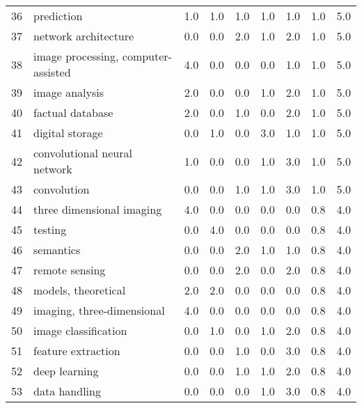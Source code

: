 \begin{tabular}{llrrrrrrr}
36 &                               prediction &   1.0 &   1.0 &   1.0 &   1.0 &   1.0 &   1.0 &    5.0 \\
37 &                     network architecture &   0.0 &   0.0 &   2.0 &   1.0 &   2.0 &   1.0 &    5.0 \\
38 &      image processing, computer-assisted &   4.0 &   0.0 &   0.0 &   0.0 &   1.0 &   1.0 &    5.0 \\
39 &                           image analysis &   2.0 &   0.0 &   0.0 &   1.0 &   2.0 &   1.0 &    5.0 \\
40 &                         factual database &   2.0 &   0.0 &   1.0 &   0.0 &   2.0 &   1.0 &    5.0 \\
41 &                          digital storage &   0.0 &   1.0 &   0.0 &   3.0 &   1.0 &   1.0 &    5.0 \\
42 &             convolutional neural network &   1.0 &   0.0 &   0.0 &   1.0 &   3.0 &   1.0 &    5.0 \\
43 &                              convolution &   0.0 &   0.0 &   1.0 &   1.0 &   3.0 &   1.0 &    5.0 \\
44 &                three dimensional imaging &   4.0 &   0.0 &   0.0 &   0.0 &   0.0 &   0.8 &    4.0 \\
45 &                                  testing &   0.0 &   4.0 &   0.0 &   0.0 &   0.0 &   0.8 &    4.0 \\
46 &                                semantics &   0.0 &   0.0 &   2.0 &   1.0 &   1.0 &   0.8 &    4.0 \\
47 &                           remote sensing &   0.0 &   0.0 &   2.0 &   0.0 &   2.0 &   0.8 &    4.0 \\
48 &                      models, theoretical &   2.0 &   2.0 &   0.0 &   0.0 &   0.0 &   0.8 &    4.0 \\
49 &               imaging, three-dimensional &   4.0 &   0.0 &   0.0 &   0.0 &   0.0 &   0.8 &    4.0 \\
50 &                     image classification &   0.0 &   1.0 &   0.0 &   1.0 &   2.0 &   0.8 &    4.0 \\
51 &                       feature extraction &   0.0 &   0.0 &   1.0 &   0.0 &   3.0 &   0.8 &    4.0 \\
52 &                            deep learning &   0.0 &   0.0 &   1.0 &   1.0 &   2.0 &   0.8 &    4.0 \\
53 &                            data handling &   0.0 &   0.0 &   0.0 &   1.0 &   3.0 &   0.8 &    4.0 \\

\end{tabular}
